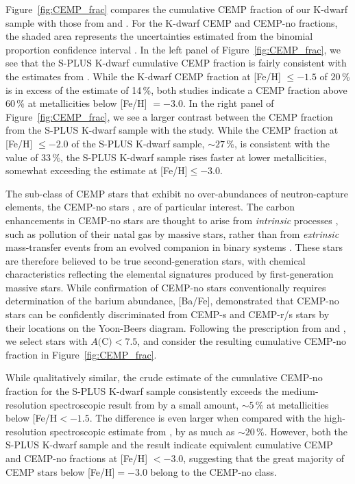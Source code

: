\documentclass[twocolumn,trackchanges]{aastex63}
\begin{document}
Figure~\ref{fig:CEMP_frac} compares the cumulative CEMP fraction of our K-dwarf sample with those from \citet{Yoon:2018:AEGIS} and \citet{Placco:2014}. For the K-dwarf CEMP and CEMP-no fractions, the shaded area represents the uncertainties estimated from the binomial proportion confidence interval \citep[see][for details]{Wilson:1927}. In the left panel of Figure~\ref{fig:CEMP_frac}, we see that the S-PLUS K-dwarf cumulative CEMP fraction is fairly consistent with the estimates from \citet{Yoon:2018:AEGIS}. While the K-dwarf CEMP fraction at [Fe/H] $\le -1.5$ of $20$\,\% is in excess of the \citet{Yoon:2018:AEGIS} estimate of 14\,\%, both studies indicate a CEMP fraction above $60$\,\% at metallicities below [Fe/H] $ = -3.0$. In the right panel of Figure~\ref{fig:CEMP_frac}, we see a larger contrast between the CEMP fraction from the S-PLUS K-dwarf sample with the \citet{Placco:2014} study. While the CEMP fraction at [Fe/H] $\le -2.0$ of the S-PLUS K-dwarf sample, $\sim 27$\,\%, is consistent with the \citet{Placco:2014} value of 33\,\%, the S-PLUS K-dwarf sample rises faster at lower metallicities, somewhat exceeding the \citet{Placco:2014} estimate at [Fe/H]$\le -3.0$.

The sub-class of CEMP stars that exhibit no over-abundances of neutron-capture elements, the CEMP-no stars \citep{Beers:2005}, are of particular interest.  The carbon enhancements in CEMP-no stars are thought to arise from \textit{intrinsic} processes \citep{Yoon:2016}, such as pollution of their natal gas by massive stars, rather than from \textit{extrinsic}  mass-transfer events from an evolved companion in binary systems \citep{Hansen:2016c}. These stars are therefore believed to be true second-generation stars, with chemical characteristics reflecting the elemental signatures produced by first-generation massive stars. While confirmation of CEMP-no stars conventionally requires determination of the barium abundance, [Ba/Fe], \citet{Yoon:2016} demonstrated that CEMP-no stars can be confidently discriminated from CEMP-s and CEMP-r/s stars by their locations on the Yoon-Beers diagram. Following the prescription from \citet{Lee:2017} and \citet{Placco:2018}, we select stars with $A\textrm{(C)}<7.5$, and consider the resulting cumulative CEMP-no fraction in Figure~\ref{fig:CEMP_frac}. 

While qualitatively similar, the crude estimate of the cumulative CEMP-no fraction for the S-PLUS K-dwarf sample consistently exceeds the medium-resolution spectroscopic result from \citet{Yoon:2018:AEGIS} by a small amount, $\sim 5$\,\% at metallicities below [Fe/H$<-1.5$. The difference is even larger when compared with the high-resolution spectroscopic estimate from \citet{Placco:2014}, by as much as $\sim 20$\,\%. However, both the S-PLUS K-dwarf sample and the \citet{Placco:2014} result indicate equivalent cumulative CEMP and CEMP-no fractions at [Fe/H] $<-3.0$, suggesting that the great majority of CEMP stars below [Fe/H]$ = -3.0$ belong to the CEMP-no class. 
\end{document}

